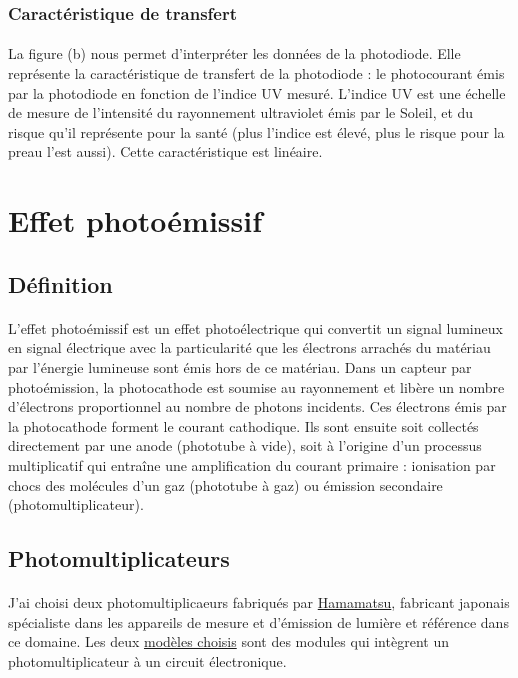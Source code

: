 \documentclass{article}
\begin{document}
    \subsubsection{Caractéristique de transfert}
    \paragraph{}
    La figure (b) nous permet d'interpréter les données de la photodiode. Elle représente la caractéristique de transfert de la photodiode : le photocourant émis par la photodiode en fonction de l'indice UV mesuré. L'indice UV est une échelle de mesure de l'intensité du rayonnement ultraviolet émis par le Soleil, et du risque qu'il représente pour la santé (plus l'indice est élevé, plus le risque pour la preau l'est aussi). Cette caractéristique est linéaire.
    

    \newpage
    \section{Effet photoémissif}

    \subsection{Définition}
    \paragraph{}
    L'effet photoémissif est un effet photoélectrique qui convertit un signal lumineux en signal électrique avec la particularité que les électrons arrachés du matériau par l'énergie lumineuse sont émis hors de ce matériau. Dans un capteur par photoémission, la photocathode est soumise au rayonnement et libère un nombre d'électrons proportionnel au nombre de photons incidents. Ces électrons émis par la photocathode forment le courant cathodique. Ils sont ensuite soit collectés directement par une anode (phototube à vide), soit à l'origine d'un processus multiplicatif qui entraîne une amplification du courant primaire : ionisation par chocs des molécules d'un gaz (phototube à gaz) ou émission secondaire (photomultiplicateur).

    \subsection{Photomultiplicateurs}
    \paragraph{}
    J'ai choisi deux photomultiplicaeurs fabriqués par \href{https://www.hamamatsu.com/}{Hamamatsu}, fabricant japonais spécialiste dans les appareils de mesure et d'émission de lumière et référence dans ce domaine. Les deux \href{https://www.hamamatsu.com/resources/pdf/etd/PMTmodules_TPMO0011E.pdf}{modèles choisis} sont des modules qui intègrent un photomultiplicateur à un circuit électronique.
    
\end{document}
